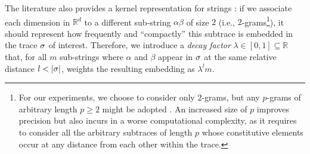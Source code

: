  The literature also provides a kernel representation for strings \cite{LodhiSSCW02,GartnerFW03}: if we associate each dimension in $\mathbb{R}^d$ to a different sub-string $\alpha\beta$ of size $2$ (i.e., $2$-grams\footnote{\label{fn:caveat}For our experiments, we choose to consider only $2$-grams, but any $p$-grams of arbitrary length $p\geq 2$ might be adopted \cite{Gartner03}. An increased size of $p$ improves precision but also incurs in a worse computational complexity, as it requires to consider all the arbitrary subtraces of length $p$ whose constitutive elements occur at any distance from each other within the trace.}), it should represent how frequently and ``compactly'' this subtrace is embedded in the trace $\sigma$ of interest. Therefore, we introduce a \emph{decay factor} $\lambda\in[0,1]\subseteq\mathbb{R}$ that, for all $m$ sub-strings where $\alpha$ and $\beta$ appear in $\sigma$ at the same relative distance $l < |\sigma|$, weights the resulting embedding as $\lambda^lm$.



